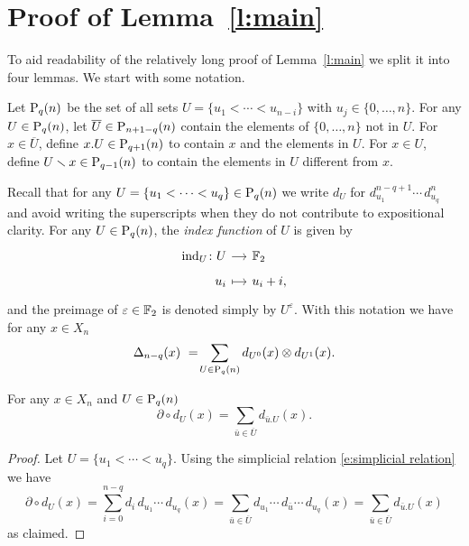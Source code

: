 
\section{Proof of Lemma~\ref{l:main}} \label{s:proof}

To aid readability of the relatively long proof of Lemma~\ref{l:main} we split it into four lemmas.
We start with some notation.

\begin{definition}
	Let $\P_q(n)$ be the set of all sets $U = \{u_1 < \cdots < u_{n-i}\}$ with $u_j \in \{0, \dots, n\}$.
	For any $U \in \P_q(n)$, let $\overline{U} \in \P_{n+1-q}(n)$ contain the elements of $\{0, \dots, n\}$ not in $U$. For $x \in \overline{U}$, define $x.U \in \P_{q+1}(n)$ to contain $x$ and the elements in $U$.
	For $x \in U$, define $U \sm x \in \P_{q-1}(n)$ to contain the elements in $U$ different from $x$.
\end{definition}

Recall that for any $U = \{u_1 < \cdots < u_q\} \in \P_q(n)$ we write $d_U$ for $d_{u_1}^{n-q+1} \cdots \,d_{u_q}^n$ and avoid writing the superscripts when they do not contribute to expositional clarity.
For any $U \in \P_q(n)$, the \textit{index function} of $U$ is given by
\begin{equation*}
\begin{tikzcd}[row sep=tiny, column sep=small,
/tikz/column 1/.append style={anchor=base east},
/tikz/column 2/.append style={anchor=base west}]
\ind_U \colon U \arrow[r] & \F_2 \\
u_i \arrow[r, mapsto] & u_i + i,
\end{tikzcd}
\end{equation*}
and the preimage of $\varepsilon \in \F_2$ is denoted simply by $U^\varepsilon$.
With this notation we have for any $x \in X_n$
\begin{equation*}
\Delta_{n-q}(x)\ =\! \sum_{U \in \P_q(n)} d_{U^0}(x) \otimes d_{U^1}(x).
\end{equation*}

\begin{lemma} \label{l:partial dU = dxU}
	For any $x \in X_n$ and $U \in \P_{q}(n)$
	\begin{equation} \label{lemma1: existence:eq1}
	\partial \circ d_U(x) = \sum_{\bar{u} \in \overline{U}} d_{\bar{u}.U}(x).
	\end{equation}
\end{lemma}

\begin{proof}
	Let $U = \{u_1 < \cdots < u_q\}$. Using the simplicial relation \eqref{e:simplicial relation} we have
	\begin{equation*}
	\partial \circ d_U(x) = 
	\sum_{i=0}^{n-q} d_i\, d_{u_1} \cdots\, d_{u_q}(x) = 
	\sum_{\bar{u} \in \overline{U}} d_{u_1} \cdots\, d_{\bar{u}} \cdots\, d_{u_q}(x) =
	\sum_{\bar{u} \in \overline{U}} d_{\bar{u}.U}(x)
	\end{equation*}
	as claimed.
\end{proof}

